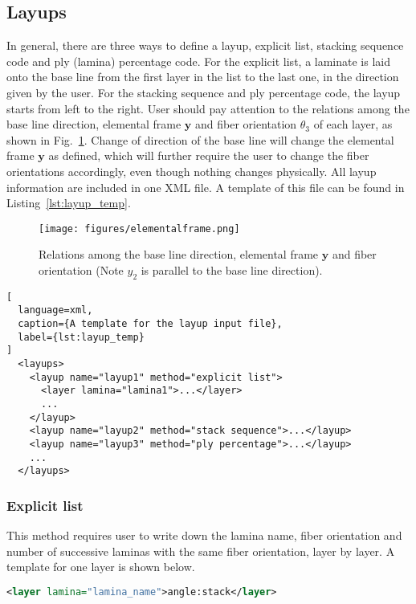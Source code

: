 \documentclass{book}
\begin{document}
\subsection{Layups}

In general, there are three ways to define a layup, explicit list, 
stacking sequence code and ply (lamina) percentage code. For the explicit 
list, a laminate is laid onto the base line from the first layer in the 
list to the last one, in the direction given by the user. For the stacking 
sequence and ply percentage code, the layup starts from left to the right. 
User should pay attention to the relations among the base line direction, 
elemental frame $\mathbf y$ and fiber orientation $\theta_3$ of each 
layer, as shown in Fig.~\ref{fig:elementalframe}. Change of direction 
of the base line will change the elemental frame $\mathbf y$ as defined, 
which will further require the user to change the fiber orientations 
accordingly, even though nothing changes physically. All layup information 
are included in one XML file. A template of this file can be found in 
Listing~\ref{lst:layup_temp}.

\begin{figure}
  \centerline{\texttt{[image: figures/elementalframe.png]}}
  \caption{Relations among the base line direction, elemental frame $\mathbf y$ and fiber orientation (Note $y_2$ is parallel to the base line direction).}
  \label{fig:elementalframe}
\end{figure}

\begin{lstlisting}[
  language=xml,
  caption={A template for the layup input file},
  label={lst:layup_temp}
]
  <layups>
    <layup name="layup1" method="explicit list">
      <layer lamina="lamina1">...</layer>
      ...
    </layup>
    <layup name="layup2" method="stack sequence">...</layup>
    <layup name="layup3" method="ply percentage">...</layup>
    ...
  </layups>
\end{lstlisting}

\subsubsection{Explicit list}

This method requires user to write down the lamina name, fiber orientation 
and number of successive laminas with the same fiber orientation, layer 
by layer. A template for one layer is shown below.

\begin{lstlisting}[language=xml]
  <layer lamina="lamina_name">angle:stack</layer>
\end{lstlisting}
\end{document}
